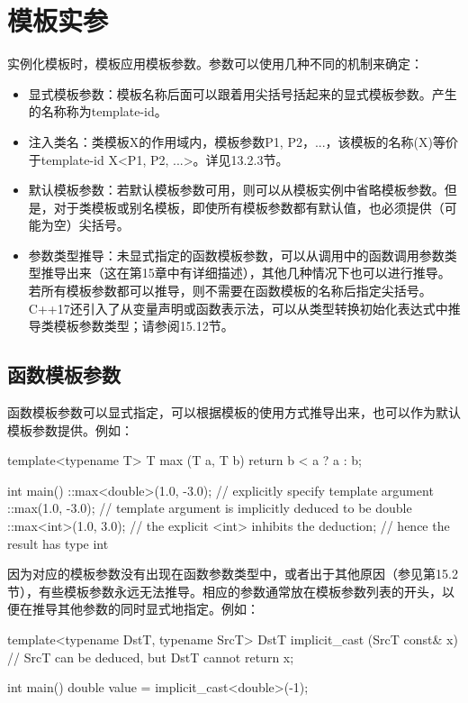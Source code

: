 \section{模板实参}

实例化模板时，模板应用模板参数。参数可以使用几种不同的机制来确定：

\begin{itemize}
\item 
显式模板参数：模板名称后面可以跟着用尖括号括起来的显式模板参数。产生的名称称为template-id。

\item 
注入类名：类模板X的作用域内，模板参数P1, P2，...，该模板的名称(X)等价于template-id X<P1, P2, ...>。详见13.2.3节。

\item 
默认模板参数：若默认模板参数可用，则可以从模板实例中省略模板参数。但是，对于类模板或别名模板，即使所有模板参数都有默认值，也必须提供（可能为空）尖括号。

\item 
参数类型推导：未显式指定的函数模板参数，可以从调用中的函数调用参数类型推导出来（这在第15章中有详细描述），其他几种情况下也可以进行推导。若所有模板参数都可以推导，则不需要在函数模板的名称后指定尖括号。C++17还引入了从变量声明或函数表示法，可以从类型转换初始化表达式中推导类模板参数类型；请参阅15.12节。
\end{itemize}

\subsection{函数模板参数}

函数模板参数可以显式指定，可以根据模板的使用方式推导出来，也可以作为默认模板参数提供。例如：

\begin{cpp}
template<typename T>
T max (T a, T b) {
	return b < a ? a : b;
}

int main() {
	::max<double>(1.0, -3.0); // explicitly specify template argument
	::max(1.0, -3.0); // template argument is implicitly deduced to be double
	::max<int>(1.0, 3.0); // the explicit <int> inhibits the deduction;
	// hence the result has type int
}
\end{cpp}

因为对应的模板参数没有出现在函数参数类型中，或者出于其他原因（参见第15.2节），有些模板参数永远无法推导。相应的参数通常放在模板参数列表的开头，以便在推导其他参数的同时显式地指定。例如：

\begin{cpp}
template<typename DstT, typename SrcT>
DstT implicit_cast (SrcT const& x) { // SrcT can be deduced, but DstT cannot
	return x;
}

int main() {
	double value = implicit_cast<double>(-1);
}
\end{cpp}

